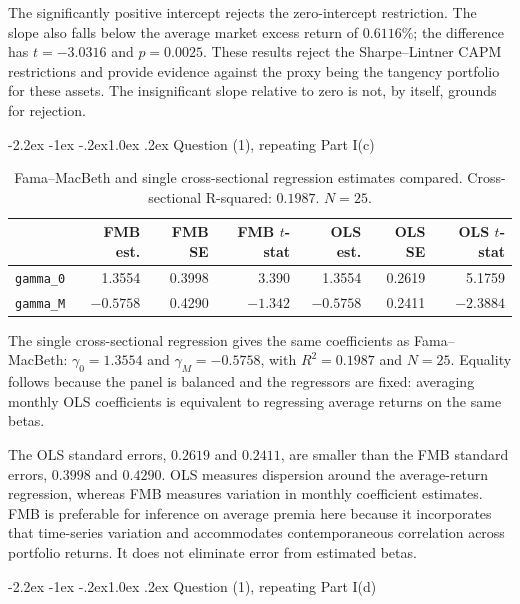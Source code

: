 \documentclass[11pt]{article}
\makeatletter
\renewcommand\subsection{\@startsection{subsection}{2}{0pt}%
  {-2.2ex \@plus -1ex \@minus -.2ex}{1.0ex \@plus .2ex}%
  {\normalfont\bfseries\normalsize\color{psink}}}
\makeatother
\begin{document}
The significantly positive intercept rejects the zero-intercept restriction.
The slope also falls below the average market excess return of $0.6116\%$; the
difference has $t = -3.0316$ and $p = 0.0025$. These results reject the
Sharpe--Lintner CAPM restrictions and provide evidence against the proxy being
the tangency portfolio for these assets. The insignificant slope relative to
zero is not, by itself, grounds for rejection.

\subsection{Question (1), repeating Part I(c)}

\begin{table}[H]
\centering
\caption{Fama--MacBeth and single cross-sectional regression estimates
compared. Cross-sectional R-squared: $0.1987$. $N = 25$.}
\small
\begin{tabular}{lrrrrrr}
\toprule
& FMB est. & FMB SE & FMB $t$-stat & OLS est. & OLS SE & OLS $t$-stat \\
\midrule
\texttt{gamma\_0} & 1.3554 & 0.3998 & 3.390 & 1.3554 & 0.2619 & 5.1759 \\
\texttt{gamma\_M} & $-0.5758$ & 0.4290 & $-1.342$ & $-0.5758$ & 0.2411 & $-2.3884$ \\
\bottomrule
\end{tabular}
\label{tab:p2c}
\end{table}

The single cross-sectional regression gives the same coefficients as
Fama--MacBeth: $\gamma_0 = 1.3554$ and $\gamma_M = -0.5758$, with
$R^2 = 0.1987$ and $N = 25$. Equality follows because the panel is balanced and
the regressors are fixed: averaging monthly OLS coefficients is equivalent to
regressing average returns on the same betas.

The OLS standard errors, $0.2619$ and $0.2411$, are smaller than the FMB
standard errors, $0.3998$ and $0.4290$. OLS measures dispersion around the
average-return regression, whereas FMB measures variation in monthly
coefficient estimates. FMB is preferable for inference on average premia here
because it incorporates that time-series variation and accommodates
contemporaneous correlation across portfolio returns. It does not eliminate
error from estimated betas.

\subsection{Question (1), repeating Part I(d)}
\end{document}
